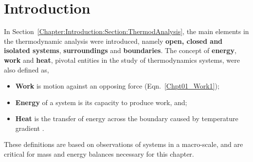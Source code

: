    
     \section{Introduction}\label{Chapter:FirstLaw:Section:Intro}
     In Section~\ref{Chapter:Introduction:Section:ThermodAnalysis}, the main elements in the thermodynamic analysis were introduced, namely {\bf open, closed and isolated systems}, {\bf surroundings} and {\bf boundaries}. The concept of {\bf energy}, {\bf work} and {\bf heat}, pivotal entities in the study of thermodynamics systems, were also defined as,
     \begin{itemize}
        \item {\bf Work} is motion against an opposing force (Eqn.~\ref{Chpt01_Work1});
        \item {\bf Energy} of a system is its capacity to produce work, and; 
        \item {\bf Heat} is the transfer of energy across the boundary caused by temperature gradient \citep{Devoe_Book}.
     \end{itemize}
     These definitions are based on observations of systems in a macro-scale, and are critical for mass and energy balances necessary for this chapter. 

